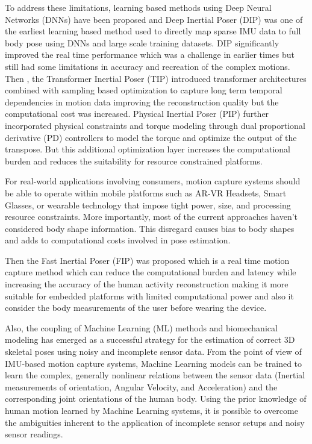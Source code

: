 \documentclass[12pt, a4paper, oneside]{report}
\begin{document}
\noindent To address these limitations, learning based methods using Deep Neural Networks (\ac{DNN}s) have been proposed and Deep Inertial Poser (\ac{DIP}) was one of the earliest learning based method used to directly map sparse \ac{IMU} data to full body pose using \ac{DNN}s and large scale training datasets. \ac{DIP} significantly improved the real time performance which was a challenge in earlier times but still had some limitations in accuracy and recreation of the complex motions. Then , the Transformer Inertial Poser (\ac{TIP}) introduced transformer architectures combined with sampling based optimization to capture long term temporal dependencies in motion data improving the reconstruction quality but the computational cost was increased. Physical Inertial Poser (\ac{PIP}) further incorporated physical constraints and torque modeling through dual proportional derivative (\ac{PD}) controllers to model the torque and optimize the output of the transpose. But this additional optimization layer increases the computational burden and reduces the suitability for resource constrained platforms.\vspace{\baselineskip}

\noindent For real-world applications involving consumers, motion capture systems should be able to operate within mobile platforms such as \ac{AR}-\ac{VR} Headsets, Smart Glasses, or wearable technology that impose tight power, size, and processing resource constraints. More importantly, most of the current approaches haven’t considered body shape information. This disregard causes bias to body shapes and adds to computational costs involved in pose estimation.\vspace{\baselineskip}

\noindent Then the Fast Inertial Poser (\ac{FIP}) was proposed which is a real time motion capture method which can reduce the computational burden and latency while increasing the accuracy of the human activity reconstruction making it more suitable for embedded platforms with limited computational power and also it consider the body measurements of the user before wearing the device.\vspace{\baselineskip}

\noindent Also, the coupling of Machine Learning (\ac{ML}) methods and biomechanical modeling has emerged as a successful strategy for the estimation of correct 3D skeletal poses using noisy and incomplete sensor data. From the point of view of \ac{IMU}-based motion capture systems, Machine Learning models can be trained to learn the complex, generally nonlinear relations between the sensor data (Inertial measurements of orientation, Angular Velocity, and Acceleration) and the corresponding joint orientations of the human body. Using the prior knowledge of human motion learned by Machine Learning systems, it is possible to overcome the ambiguities inherent to the application of incomplete sensor setups and noisy sensor readings.\vspace{\baselineskip}
\end{document}
